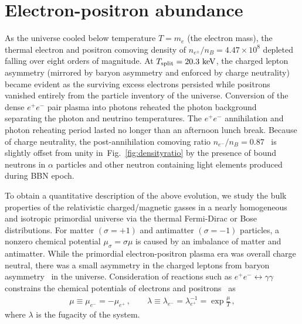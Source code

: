 \documentclass[a4paper]{article}
\newcommand*{\keV}{\text{ keV}}
\newcommand{\rf}[1]{Fig.~{\ref{#1}}}
\newcommand*{\xblue}{\color{black}}
\begin{document}
\section{Electron-positron abundance}
\label{sec:abundance}
\noindent As the universe cooled below temperature $T=m_{e}$ (the electron mass), the thermal electron and positron comoving density {\xblue of $n_{e^{\pm}}/n_{B}=4.47\times10^{8}$} depleted falling over eight orders of magnitude. At $T_{\rm split}=20.3\keV$, the charged lepton asymmetry (mirrored by baryon asymmetry {\xblue and enforced by charge neutrality}) became evident {\xblue as the surviving excess electrons persisted while positrons vanished entirely from the particle inventory of the universe. Conversion of the dense $e^{+}e^{-}$ pair plasma into photons reheated the photon background~\cite{birrell2014relic} separating the photon and neutrino temperatures. The $e^{+}e^{-}$ annihilation and photon reheating period lasted no longer than an afternoon lunch break.} Because of charge neutrality, the post-annihilation comoving ratio $n_{e^{-}}/n_{B}=0.87$~\cite{rafelski2023short} is slightly offset from unity in~\rf{fig:densityratio} by the presence of bound neutrons in $\alpha$ particles and  other neutron containing light elements produced during BBN epoch. 

{\xblue To obtain a quantitative description of the above evolution, we study the bulk properties of the relativistic charged/magnetic gasses in a nearly homogeneous and isotropic primordial universe via} the thermal Fermi-Dirac or Bose distributions. {\xblue For matter $(\sigma=+1)$ and antimatter $(\sigma=-1)$ particles, a nonzero chemical potential $\mu_{\sigma}=\sigma\mu$ is caused by an imbalance of matter and antimatter. While the primordial electron-positron plasma era was overall charge neutral, there was a small asymmetry in the charged leptons from baryon asymmetry~\cite{fromerth2012quarkgluon,canetti2012matter} in the universe. Consideration of reactions such as $e^+e^-\leftrightarrow\gamma\gamma$ constrains the chemical potentials of electrons and positrons~\cite{elze1980relativistic} as 
\begin{align}
    \label{cpotential}
    \mu\equiv\mu_{e^{-}}=-\mu_{e^{+}}\,,\qquad
    \lambda\equiv\lambda_{e^{-}}=\lambda_{e^{+}}^{-1}=\exp\frac{\mu}{T}\,,
\end{align}
where $\lambda$ is the fugacity of the system.} 
\end{document}
